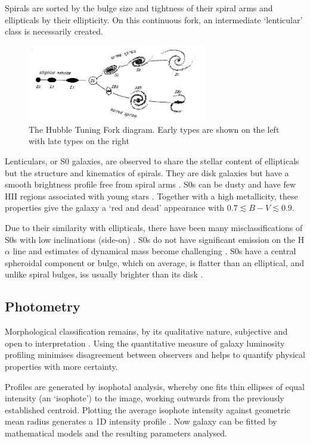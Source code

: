 Spirals are sorted by the bulge size and tightness of their spiral arms and ellipticals by their ellipticity. On this continuous fork, an intermediate `lenticular' class is necessarily created. 
\begin{figure}[h]
	\centering
	\includegraphics[width=0.7\textwidth]{figs/Hubble_fork.jpg}
	\caption{\footnotesize{The Hubble Tuning Fork diagram. Early types are shown on the left with late types on the right \citep{hubble_no._1926}}}
	\label{hubble_fork}
\end{figure}
Lenticulars, or S0 galaxies, are observed to share the stellar content of ellipticals but the structure and kinematics of spirals. They are disk galaxies but have a smooth brightness profile free from spiral arms \citep{blanton_physical_2009}. S0s can be dusty and have few HII regions associated with young stars \citep{degraaff_galaxy_2007}. Together with a high metallicity, these properties give the galaxy a `red and dead' appearance with $0.7\lesssim B-V \lesssim 0.9$.

Due to their similarity with ellipticals, there have been many misclassifications of S0s with low inclinations (side-on) \citep{laurikainen_multicomponent_2005}. 
S0s do not have significant emission on the H$\alpha$ line and estimates of dynamical mass become challenging \citep{dressler_rotational_1983}. S0s have a central spheroidal component or bulge, which on average, is flatter than an elliptical, and unlike spiral bulges, iss usually brighter than its disk \citep{dressler_galaxy_1980}.

\subsection{Photometry}
Morphological classification remains, by its qualitative nature, subjective and open to interpretation \citep{naim_automated_1995}. Using the quantitative measure of galaxy luminosity profiling minimises disagreement between observers and helps to quantify physical properties with more certainty. 

Profiles are generated by isophotal analysis, whereby one fits thin ellipses of equal intensity (an `isophote') to the image, working outwards from the previously established centroid. Plotting the average isophote intensity against geometric mean radius generates a 1D intensity profile \citep{peng_detailed_2002}. Now galaxy can be fitted by mathematical models and the resulting parameters analysed. 

